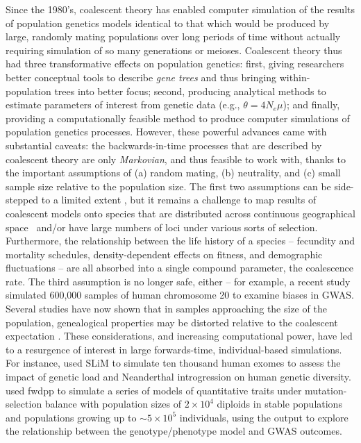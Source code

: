 \documentclass{article}
\begin{document}
Since the 1980's, coalescent theory has enabled computer simulation of the results of population genetics models
identical to that which would be produced by large, randomly mating populations over long periods of time
without actually requiring simulation of so many generations or meioses.
Coalescent theory thus had three transformative effects on population genetics:
first, giving researchers better conceptual tools to describe \emph{gene trees} and thus bringing within-population trees into better focus;
second, producing analytical methods to estimate parameters of interest from genetic data (e.g., $\theta = 4N_e \mu$);
and finally, providing a computationally feasible method to produce computer simulations of population genetics processes.
However, these powerful advances came with substantial caveats:
the backwards-in-time processes that are described by coalescent theory
are only \emph{Markovian}, and thus feasible to work with,
thanks to the important assumptions of
(a) random mating,
(b) neutrality,
and (c) small sample size relative to the population size.
The first two assumptions can be side-stepped to a limited extent \citep{hudson1990gene, Neuhauser1997-nn},
but it remains a challenge to map results of coalescent models
onto species that are distributed across continuous geographical
space~\citep{barton2010new,kelleher2014coalescent}
and/or have large numbers of loci under various sorts of selection.
Furthermore, the relationship between the life history of a species --
fecundity and mortality schedules, density-dependent effects on fitness, and demographic fluctuations --
are all absorbed into a single compound parameter, the coalescence rate.
The third assumption is no longer safe, either --
for example, a recent study~\citep{martin2017human}
simulated 600,000 samples of human chromosome 20 to examine biases in GWAS.
Several studies have now shown that in samples approaching the size of the population,
genealogical properties may be distorted relative to the coalescent expectation
\citep{wakeley2003gene,maruvka2011recovering,bhaskar2014distortion}.
These considerations, and increasing computational power, have led to a resurgence of
interest in large forwards-time, individual-based simulations.
For instance, \citet{harris2016genetic} used SLiM \citep{slim} to simulate ten thousand human exomes
to assess the impact of genetic load and Neanderthal introgression on human genetic diversity.
\cite{Sanjak2017-ko} used
fwdpp \citep{fwdpp} to simulate a series of models of quantitative traits under mutation-selection balance with
population sizes of $2 \times 10^4$ diploids in stable populations and populations growing up to $\sim 5
\times 10^5$ individuals, using the output to explore the relationship between the genotype/phenotype model and GWAS
outcomes.
\end{document}
